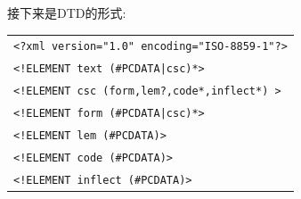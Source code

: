接下来是DTD的形式:

\begin{tabular}{l}
\texttt{<?xml version="1.0" encoding="ISO-8859-1"?>}\\
\texttt{<!ELEMENT text (\#PCDATA|csc)*>}\\
\texttt{<!ELEMENT csc (form,lem?,code*,inflect*) >}\\
\texttt{<!ELEMENT form (\#PCDATA|csc)*>}\\
\texttt{<!ELEMENT lem (\#PCDATA)>}\\
\texttt{<!ELEMENT code (\#PCDATA)>}\\
\texttt{<!ELEMENT inflect (\#PCDATA)>}\\
\end{tabular}


